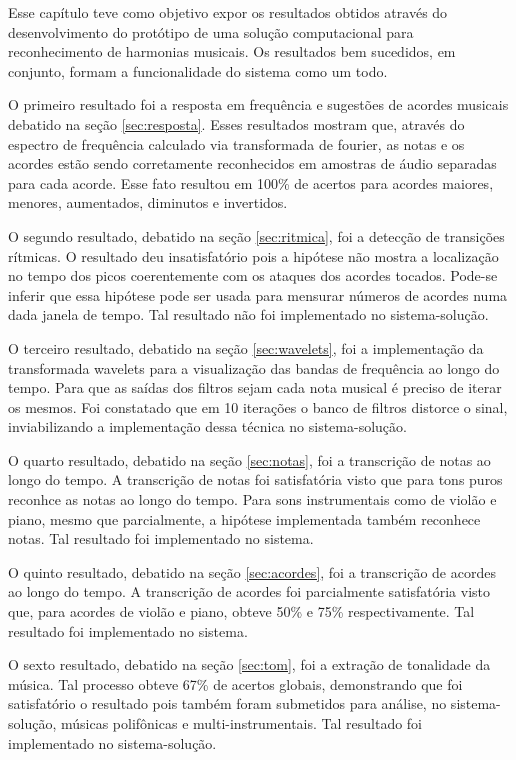 Esse capítulo teve como objetivo expor os resultados obtidos através do desenvolvimento do protótipo de uma solução computacional para reconhecimento de harmonias musicais. Os resultados bem sucedidos, em conjunto, formam a funcionalidade do sistema como um todo.

O primeiro resultado foi a resposta em frequência e sugestões de acordes musicais debatido na seção \ref{sec:resposta}. Esses resultados mostram que, através do espectro de frequência calculado via transformada de fourier, as notas e os acordes estão sendo corretamente reconhecidos em amostras de áudio separadas para cada acorde. Esse fato resultou em 100\% de acertos para acordes maiores, menores, aumentados, diminutos e invertidos.

O segundo resultado, debatido na seção \ref{sec:ritmica}, foi a detecção de transições rítmicas. O resultado deu insatisfatório pois a hipótese não mostra a localização no tempo dos picos coerentemente com os ataques dos acordes tocados. Pode-se inferir que essa hipótese pode ser usada para mensurar números de acordes numa dada janela de tempo. Tal resultado não foi implementado no sistema-solução.

O terceiro resultado, debatido na seção \ref{sec:wavelets}, foi a implementação da transformada wavelets para a visualização das bandas de frequência ao longo do tempo. Para que as saídas dos filtros sejam cada nota musical é preciso de iterar os mesmos. Foi constatado que em 10 iterações o banco de filtros distorce o sinal, inviabilizando a implementação dessa técnica no sistema-solução.

O quarto resultado, debatido na seção \ref{sec:notas}, foi a transcrição de notas ao longo do tempo. A transcrição de notas foi satisfatória visto que para tons puros reconhce as notas ao longo do tempo. Para sons instrumentais como de violão e piano, mesmo que parcialmente, a hipótese implementada também reconhece notas. Tal resultado foi implementado no sistema.

O quinto resultado, debatido na seção \ref{sec:acordes}, foi a transcrição de acordes ao longo do tempo. A transcrição de acordes foi parcialmente satisfatória visto que, para acordes de violão e piano, obteve 50\% e 75\% respectivamente. Tal resultado foi implementado no sistema.

O sexto resultado, debatido na seção \ref{sec:tom}, foi a extração de tonalidade da música. Tal processo obteve 67\% de acertos globais, demonstrando que foi satisfatório o resultado pois também foram submetidos para análise, no sistema-solução, músicas polifônicas e multi-instrumentais. Tal resultado foi implementado no sistema-solução.

